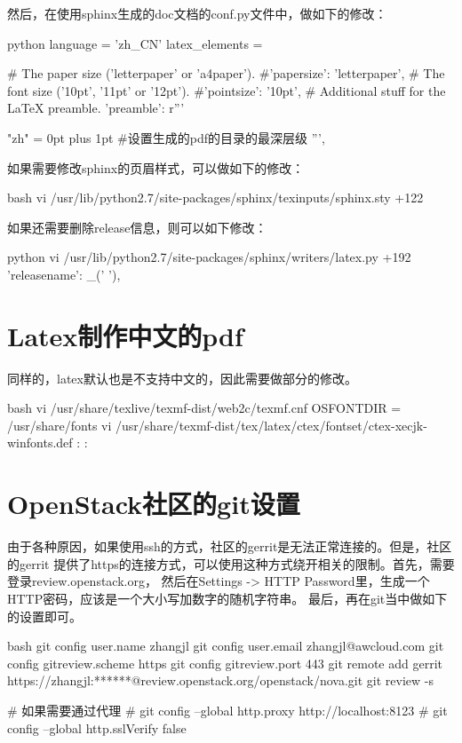 然后，在使用sphinx生成的doc文档的conf.py文件中，做如下的修改：
\begin{code-block}{python}
language = 'zh_CN'
latex_elements = {
# The paper size ('letterpaper' or 'a4paper').
#'papersize': 'letterpaper',
# The font size ('10pt', '11pt' or '12pt').
#'pointsize': '10pt',
# Additional stuff for the LaTeX preamble.
'preamble': r'''
     \usepackage{xeCJK}
     \XeTeXlinebreaklocale "zh"
     \XeTeXlinebreakskip = 0pt plus 1pt
     \setcounter{tocdepth}{4}  #设置生成的pdf的目录的最深层级
''',
}
\end{code-block}

如果需要修改sphinx的页眉样式，可以做如下的修改：
\begin{code-block}{bash}
vi /usr/lib/python2.7/site-packages/sphinx/texinputs/sphinx.sty +122
\fancyhead[LE,RO]{{\py@HeaderFamily \@title}}
\end{code-block}

如果还需要删除release信息，则可以如下修改：
\begin{code-block}{python}
vi /usr/lib/python2.7/site-packages/sphinx/writers/latex.py +192
'releasename':  _(' '),
\end{code-block}

\section{Latex制作中文的pdf}
同样的，latex默认也是不支持中文的，因此需要做部分的修改。
\begin{code-block}{bash}
vi /usr/share/texlive/texmf-dist/web2c/texmf.cnf
OSFONTDIR = /usr/share/fonts
vi /usr/share/texmf-dist/tex/latex/ctex/fontset/ctex-xecjk-winfonts.def
:%
:%
\end{code-block}

\section{OpenStack社区的git设置}
由于各种原因，如果使用ssh的方式，社区的gerrit是无法正常连接的。但是，社区的gerrit
提供了https的连接方式，可以使用这种方式绕开相关的限制。首先，需要登录review.openstack.org，
然后在Settings -> HTTP Password里，生成一个HTTP密码，应该是一个大小写加数字的随机字符串。
最后，再在git当中做如下的设置即可。
\begin{code-block}{bash}
git config user.name zhangjl
git config user.email zhangjl@awcloud.com
git config gitreview.scheme https
git config gitreview.port 443
git remote add gerrit https://zhangjl:******@review.openstack.org/openstack/nova.git
git review -s

# 如果需要通过代理
# git config --global http.proxy http://localhost:8123
# git config --global http.sslVerify false
\end{code-block}

